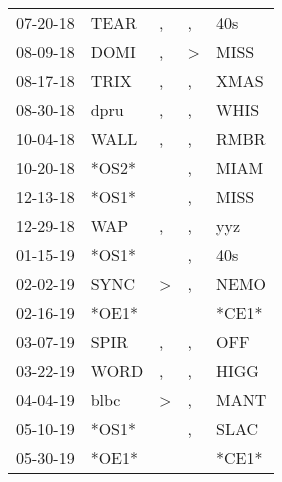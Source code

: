 \begin{supertabular}{p{0.07\textwidth}p{0.06\textwidth}p{0.02\textwidth}p{0.02\textwidth}p{0.06\textwidth}}
 07-20-18\textsuperscript{} &           TEAR\textsuperscript{} &                , &             , &   40s\textsuperscript{} \\
 08-09-18\textsuperscript{} &           DOMI\textsuperscript{} &                , &  \textgreater &  MISS\textsuperscript{} \\
 08-17-18\textsuperscript{} &           TRIX\textsuperscript{} &                , &             , &  XMAS\textsuperscript{} \\
 08-30-18\textsuperscript{} &           dpru\textsuperscript{} &                , &             , &  WHIS\textsuperscript{} \\
 10-04-18\textsuperscript{} &           WALL\textsuperscript{} &                , &             , &  RMBR\textsuperscript{} \\
 10-20-18\textsuperscript{} &                            *OS2* &                  &             , &  MIAM\textsuperscript{} \\
 12-13-18\textsuperscript{} &                            *OS1* &                  &             , &  MISS\textsuperscript{} \\
 12-29-18\textsuperscript{} &            WAP\textsuperscript{} &                , &             , &   yyz\textsuperscript{} \\
 01-15-19\textsuperscript{} &                            *OS1* &                  &             , &   40s\textsuperscript{} \\
 02-02-19\textsuperscript{} &           SYNC\textsuperscript{} &     \textgreater &             , &  NEMO\textsuperscript{} \\
 02-16-19\textsuperscript{} &                            *OE1* &                  &               &                   *CE1* \\
 03-07-19\textsuperscript{} &           SPIR\textsuperscript{} &                , &             , &   OFF\textsuperscript{} \\
 03-22-19\textsuperscript{} &           WORD\textsuperscript{} &                , &             , &  HIGG\textsuperscript{} \\
 04-04-19\textsuperscript{} &           blbc\textsuperscript{} &     \textgreater &             , &  MANT\textsuperscript{} \\
 05-10-19\textsuperscript{} &                            *OS1* &                  &             , &  SLAC\textsuperscript{} \\
 05-30-19\textsuperscript{} &                            *OE1* &                  &               &                   *CE1* \\

\end{supertabular}
